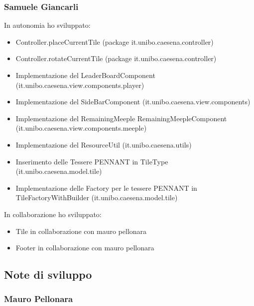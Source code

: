 \subsubsection*{Samuele Giancarli}
In autonomia ho sviluppato:
\begin{itemize}
    \item Controller.placeCurrentTile (package it.unibo.caesena.controller)
    \item Controller.rotateCurrentTile (package it.unibo.caesena.controller)
    \item Implementazione del LeaderBoardComponent (it.unibo.caesena.view.components.player)
    \item Implementazione del SideBarComponent (it.unibo.caesena.view.components)
    \item Implementazione del RemainingMeeple RemainingMeepleComponent (it.unibo.caesena.view.components.meeple)
    \item Implementazione del ResourceUtil (it.unibo.caesena.utils)
    \item Inserimento delle Tessere PENNANT in TileType (it.unibo.caesena.model.tile)
    \item Implementazione delle Factory per le tessere PENNANT in TileFactoryWithBuilder (it.unibo.caesena.model.tile)
\end{itemize}

In collaborazione ho sviluppato:
\begin{itemize}
    \item Tile in collaborazione con mauro pellonara
    \item Footer in collaborazione con mauro pellonara
\end{itemize}

\subsection{Note di sviluppo}
\subsubsection*{Mauro Pellonara} 

